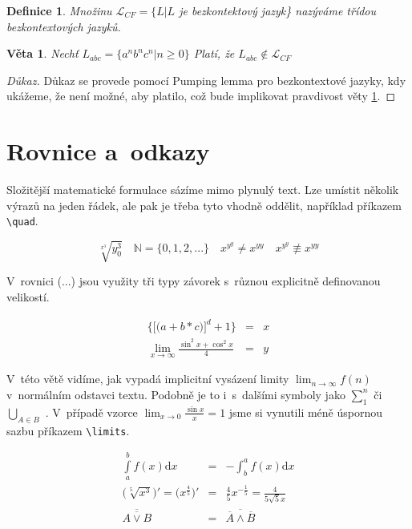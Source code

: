 \documentclass[11pt,a4paper,twocolumn]{article}
\newtheorem{mydef}[thm]{Definice}
\newtheorem{mysnt}{Věta}
\begin{document}
\begin{mydef}
	\normalfont
		Množinu $\mathcal{L}_{CF} = \{L|L $ je bezkontektový jazyk\} nazýváme \emph{třídou bezkontextových jazyků}.
\end{mydef}

\begin{mysnt}\label{snt}
	Nechť $L_{abc} = \{ a^n b^n c^n | n \geq 0 \}$ Platí, že $L_{abc} \not\in \mathcal{L}_{CF}$
\end{mysnt}

\begin{proof}[Důkaz]
	Důkaz se provede pomocí Pumping lemma pro bezkontextové jazyky, kdy ukážeme, že není možné, aby platilo, což bude implikovat pravdivost věty \ref{snt}.
\end{proof}

\section{Rovnice a~odkazy}

Složitější matematické formulace sázíme mimo plynulý text. Lze umístit několik výrazů na jeden řádek, ale pak je třeba tyto vhodně oddělit, například příkazem \verb|\quad|. 


\begin{equation*}
	\sqrt[x^3]{y^3_0} \quad
	\mathbb{N} = \{0,1,2,...\} \quad
	x^{y^y} \ne x^{yy} \quad
	x^{y^y} \not\equiv x^{yy}
\end{equation*}

V~rovnici (...) jsou využity tři typy závorek s~různou explicitně definovanou velikostí.

\begin{eqnarray}
	\bigg\{ \Big[ \big(a + b * c \big) \Big] ^d + 1 \bigg\}  & = & x \label{eq}\\
	\lim_{x\rightarrow\infty} \frac{ \sin^2x + \cos^2x}{4}  & = & y \nonumber
\end{eqnarray}

V~této větě vidíme, jak vypadá implicitní vysázení li\-mi\-ty $\lim_{n \rightarrow \infty} f(n)$ v~normálním odstavci textu. Podobně je to i~s~dalšími symboly jako $\sum^n_1$ či $\bigcup_{A \in B}$ . V~případě vzorce $\lim_{x \rightarrow 0} \limits \frac{\sin x}{x} = 1$  jsme si vynutili méně úspornou sazbu příkazem \verb|\limits|.

\begin{eqnarray}
	\int\limits_a^b f(x) \mathrm{d}x & = & - \int_b^a f(x) \mathrm{d}x \\
	\Big( \sqrt[5]{x^3} \Big) ' = \Big( x^{\frac{4}{5}} \Big) ' & = &
	\frac{4}{5} x^{-\frac{1}{5}} = \frac{4}{5 \sqrt{5}{x} } \\
	\overline{\overline{A \lor B}} & = & \overline{\overline{A} \land \overline{B}}
\end{eqnarray}
\end{document}

